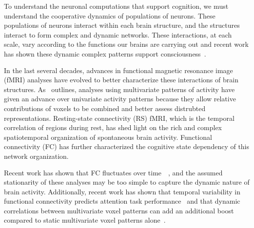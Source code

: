 


To understand the neuronal computations that support cognition, we
must understand the cooperative dynamics of populations of neurons.
These populations of neurons interact within each brain structure, and
the structures interact to form complex and dynamic networks. These
interactions, at each scale, vary according to the functions our
brains are carrying out and recent work has shown these dynamic
complex patterns support consciousness~\citep{DemeEtal19}.

In the last several decades, advances in functional magnetic resonance
image (fMRI) analyses have evolved to better characterize these
interactions of brain structures.  As~\cite{Turk13} outlines,
analyses using multivariate patterns of activity have given an advance
over univariate activity patterns because they allow relative
contributions of voxels to be combined and better assess distrubted
representations. Resting-state connectivity (RS) fMRI, which is the
temporal correlation of regions during rest, has shed light on the
rich and complex spatiotemporal organization of spontaneous brain
activity.  Functional connectivity (FC) has further characterized the
cognitive state dependency of this network organization.

Recent work has shown that FC fluctuates over time~\citep{ChanGlov10}~\citep[for review]{LuriEtal18}, and the assumed stationarity of these analyses may be too
simple to capture the dynamic nature of brain activity.  Additionally,
recent work has shown that temporal
variability in functional connectivity predicts attention task
performance~\citep{FongEtal19} and that
dynamic correlations between multivariate voxel patterns can add an
additional boost compared to static multivariate voxel patterns alone~\citep{MannEtal18}.





